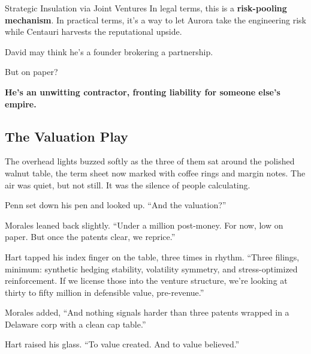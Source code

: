 \begin{TechnicalSidebar}{Strategic Insulation via Joint Ventures}
  In legal terms, this is a \textbf{risk-pooling mechanism}. In practical terms, it’s a way to let Aurora take the engineering 
  risk while Centauri harvests the reputational upside.
  
  \medskip
  
  David may think he’s a founder brokering a partnership.

  \medskip
  
  But on paper?

  \medskip
  
  \textbf{He’s an unwitting contractor, fronting liability for someone else’s empire.}
  
\end{TechnicalSidebar}


\medskip


\subsection{The Valuation Play}

The overhead lights buzzed softly as the three of them sat around the polished walnut table, the term sheet now 
marked with coffee rings and margin notes. The air was quiet, but not still. It was the silence of people calculating.

Penn set down his pen and looked up. ``And the valuation?''

Morales leaned back slightly. ``Under a million post-money. For now, low on paper. But once the patents clear, we reprice.''

Hart tapped his index finger on the table, three times in rhythm. ``Three filings, minimum: synthetic hedging stability, 
volatility symmetry, and stress-optimized reinforcement. If we license those into the venture structure, we’re looking at 
thirty to fifty million in defensible value, pre-revenue.''

Morales added, ``And nothing signals harder than three patents wrapped in a Delaware corp with a clean cap table.''

Hart raised his glass. ``To value created. And to value believed.''

\medskip

